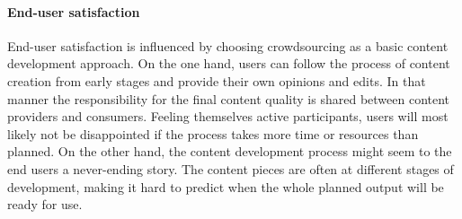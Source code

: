 \documentclass[ngerman,UKenglish,table]{scrbook}
\begin{document}
%
%

\paragraph{End-user satisfaction}

End-user satisfaction is influenced by choosing crowdsourcing as a basic content development approach.
On the one hand, users can follow the process of content creation from early stages and provide their own opinions and edits.
In that manner the responsibility for the final content quality is shared between content providers and consumers.
Feeling themselves active participants, users will most likely not be disappointed if the process takes more time or resources than planned.
On the other hand, the content development process might seem to the end users a never-ending story.
The content pieces are often at different stages of development, making it hard to predict when the whole planned output will be ready for use.

%
%
%
%
%
\end{document}
